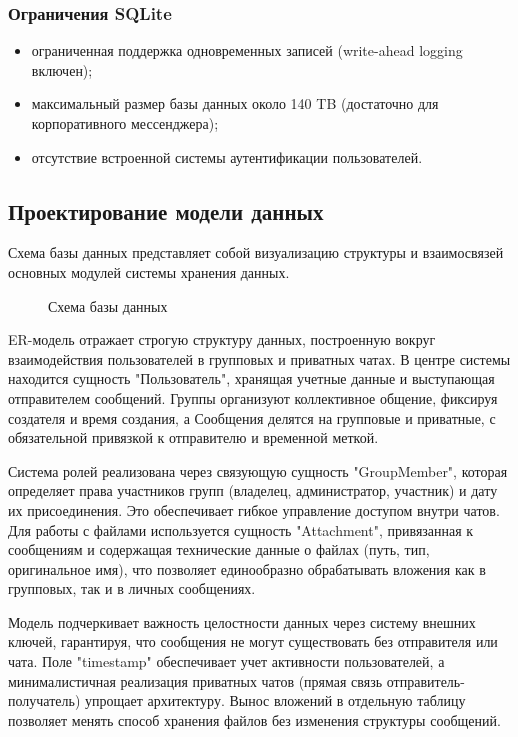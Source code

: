 \subsubsection{Ограничения SQLite}
\begin{itemize}
	\item ограниченная поддержка одновременных записей (write-ahead logging включен);
	\item максимальный размер базы данных около 140 TB (достаточно для корпоративного мессенджера);
	\item отсутствие встроенной системы аутентификации пользователей.
\end{itemize}

\subsection{Проектирование модели данных}

Схема базы данных представляет собой визуализацию структуры и взаимосвязей основных модулей системы хранения данных.

\begin{figure}[ht]
\caption{Схема базы данных}
\label{comp:image}
\end{figure}

ER-модель отражает строгую структуру данных, построенную вокруг взаимодействия пользователей в групповых и приватных чатах. В центре системы находится сущность "Пользователь", хранящая учетные данные и выступающая отправителем сообщений. Группы организуют коллективное общение, фиксируя создателя и время создания, а Сообщения делятся на групповые и приватные, с обязательной привязкой к отправителю и временной меткой.

Система ролей реализована через связующую сущность "GroupMember", которая определяет права участников групп (владелец, администратор, участник) и дату их присоединения. Это обеспечивает гибкое управление доступом внутри чатов. Для работы с файлами используется сущность "Attachment", привязанная к сообщениям и содержащая технические данные о файлах (путь, тип, оригинальное имя), что позволяет единообразно обрабатывать вложения как в групповых, так и в личных сообщениях.

Модель подчеркивает важность целостности данных через систему внешних ключей, гарантируя, что сообщения не могут существовать без отправителя или чата. Поле "timestamp" обеспечивает учет активности пользователей, а минималистичная реализация приватных чатов (прямая связь отправитель-получатель) упрощает архитектуру. Вынос вложений в отдельную таблицу позволяет менять способ хранения файлов без изменения структуры сообщений.

